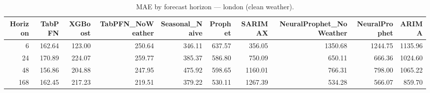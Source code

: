 \begin{table}[ht!]
\centering
\caption{MAE by forecast horizon — london (clean weather).}
\label{tab:mae_by_horizon_london}
\begin{tabular}{rrrrrrrrrr}
\toprule
Horizon & TabPFN & XGBoost & TabPFN_NoWeather & Seasonal_Naive & Prophet & SARIMAX & NeuralProphet_NoWeather & NeuralProphet & ARIMA \\
\midrule
6 & 162.64 & 123.00 & 250.64 & 346.11 & 637.57 & 356.05 & 1350.68 & 1244.75 & 1135.96 \\
24 & 170.89 & 224.07 & 259.77 & 385.37 & 586.80 & 750.09 & 650.11 & 666.36 & 1024.60 \\
48 & 156.86 & 204.88 & 247.95 & 475.92 & 598.65 & 1160.01 & 766.31 & 798.00 & 1065.22 \\
168 & 162.45 & 217.23 & 219.51 & 379.22 & 530.11 & 1267.39 & 534.28 & 566.07 & 859.70 \\
\bottomrule
\end{tabular}
\end{table}
